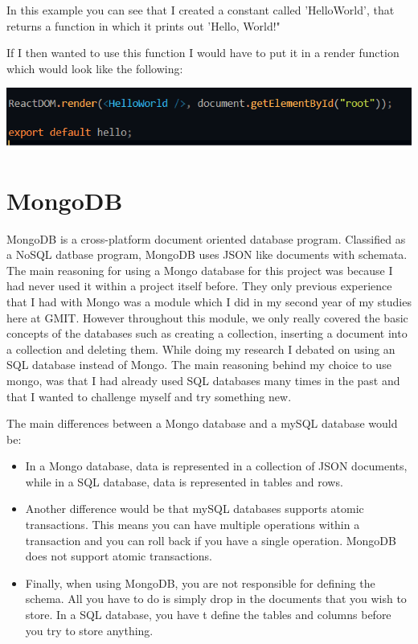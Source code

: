 In this example you can see that I created a constant called 'HelloWorld', that returns a function in which it prints out 'Hello, World!"

If I then wanted to use this function I would have to put it in a render function which would look like the following:
\begin{center}    
\includegraphics{img/hello.png}
\end{center}

\section{MongoDB}
MongoDB is a cross-platform document oriented database program. Classified as a NoSQL datbase program, MongoDB uses JSON like documents with schemata\cite{MongoDB}. The main reasoning for using a Mongo database for this project was because I had never used it within a project itself before. They only previous experience that I had with Mongo was a module which I did in my second year of my studies here at GMIT. However throughout this module, we only really covered the basic concepts of the databases such as creating a collection, inserting a document into a collection and deleting them. While doing my research I debated on using an SQL database instead of Mongo. The main reasoning behind my choice to use mongo, was that I had already used SQL databases many times in the past and that I wanted to challenge myself and try something new.

The main differences between a Mongo database and a mySQL database would be:

\begin{itemize}
  \item In a Mongo database, data is represented in a collection of JSON documents, while in a SQL database, data is represented in tables and rows.
  \item Another difference would be that mySQL databases supports atomic transactions. This means you can have multiple operations within a transaction and you can roll back if you have a single operation. MongoDB does not support atomic transactions.
  \item Finally, when using MongoDB, you are not responsible for defining the schema. All you have to do is simply drop in the documents that you wish to store. In a SQL database, you have t define the tables and columns before you try to store anything.
\end{itemize}

